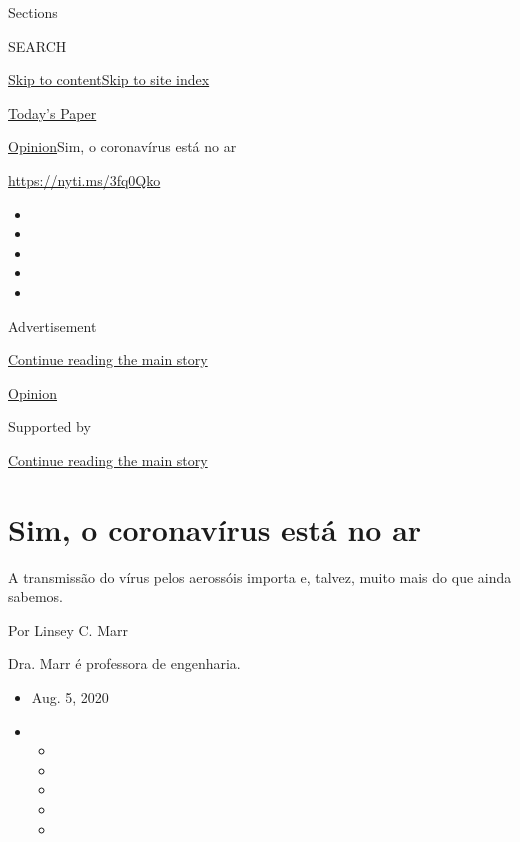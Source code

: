 Sections

SEARCH

\protect\hyperlink{site-content}{Skip to
content}\protect\hyperlink{site-index}{Skip to site index}

\href{https://myaccount.nytimes.com/auth/login?response_type=cookie\&client_id=vi}{}

\href{https://www.nytimes.com/section/todayspaper}{Today's Paper}

\href{/section/opinion}{Opinion}\textbar{}Sim, o coronavírus está no ar

\href{https://nyti.ms/3fq0Qko}{https://nyti.ms/3fq0Qko}

\begin{itemize}
\item
\item
\item
\item
\item
\end{itemize}

Advertisement

\protect\hyperlink{after-top}{Continue reading the main story}

\href{/section/opinion}{Opinion}

Supported by

\protect\hyperlink{after-sponsor}{Continue reading the main story}

\hypertarget{sim-o-coronavuxedrus-estuxe1-no-ar}{%
\section{Sim, o coronavírus está no
ar}\label{sim-o-coronavuxedrus-estuxe1-no-ar}}

A transmissão do vírus pelos aerossóis importa e, talvez, muito mais do
que ainda sabemos.

Por Linsey C. Marr

Dra. Marr é professora de engenharia.

\begin{itemize}
\item
  Aug. 5, 2020
\item
  \begin{itemize}
  \item
  \item
  \item
  \item
  \item
  \end{itemize}
\end{itemize}

